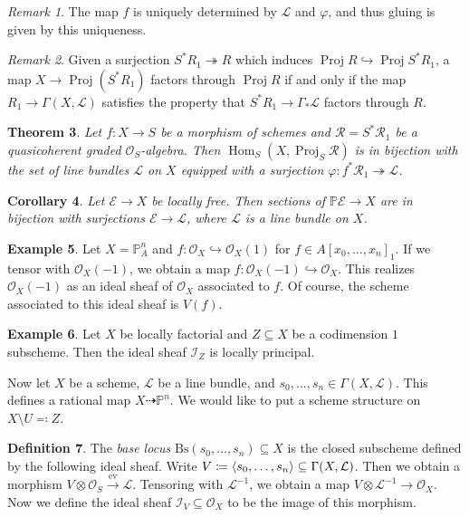 \documentclass[leqno, openany]{memoir}
\newtheorem{thm}{Theorem}[section]
\newtheorem{cor}[thm]{Corollary}
\theoremstyle{definition}
\newtheorem{defn}[thm]{Definition}
\newtheorem{exm}[thm]{Example}
\theoremstyle{remark}
\newtheorem{rmk}[thm]{Remark}
\theoremstyle{plain}
\theoremstyle{definition}
\theoremstyle{remark}
\renewcommand{\P}{\mathbb{P}}
\newcommand{\mc}[1]{\mathcal{#1}}
\newcommand{\mr}[1]{\mathrm{#1}}
\DeclareMathOperator{\Hom}{Hom}
\DeclareMathOperator{\Proj}{Proj}
\begin{document}
\begin{rmk} The map $f$ is uniquely determined by $\mc{L}$ and $\varphi$, and
thus gluing is given by this uniqueness.  \end{rmk}

\begin{rmk} Given a surjection $S^* R_1 \twoheadrightarrow R$ which induces
    $\Proj R \hookrightarrow \Proj S^* R_1$, a map $X \to \Proj(S^* R_1)$
    factors through $\Proj R$ if and only if the map $R_1 \to \Gamma(X,
    \mc{L})$ satisfies the property that $S^* R_1 \to \Gamma_* \mc{L}$ factors
    through $R$.  \end{rmk}

\begin{thm} Let $f \colon X \to S$ be a morphism of schemes and $\mc{R} = S^*
    \mc{R}_1$ be a quasicoherent graded $\mc{O}_S$-algebra. Then $\Hom_S(X,
    \Proj_S \mc{R})$ is in bijection with the set of line bundles $\mc{L}$ on
    $X$ equipped with a surjection $\varphi \colon f^* \mc{R}_1
    \twoheadrightarrow \mc{L}$.  \end{thm}

\begin{cor} Let $\mc{E} \to X$ be locally free. Then sections of $\P \mc{E} \to
X$ are in bijection with surjections $\mc{E} \to \mc{L}$, where $\mc{L}$ is a
line bundle on $X$.  \end{cor}

\begin{exm} Let $X = \P^n_A$ and $f \colon \mc{O}_X \hookrightarrow
    \mc{O}_X(1)$ for $f \in { A[x_0, \ldots, x_n] }_1$. If we tensor with
    $\mc{O}_X(-1)$, we obtain a map $f \colon \mc{O}_X(-1) \hookrightarrow
    \mc{O}_X$. This realizes $\mc{O}_X(-1)$ as an ideal sheaf of $\mc{O}_X$
    associated to $f$. Of course, the scheme associated to this ideal sheaf is
    $V(f)$.  \end{exm}

\begin{exm} Let $X$ be locally factorial and $Z \subseteq X$ be a codimension
$1$ subscheme. Then the ideal sheaf $\mc{I}_Z$ is locally principal.  \end{exm}

Now let $X$ be a scheme, $\mc{L}$ be a line bundle, and $s_0, \ldots, s_n \in
\Gamma(X, \mc{L})$. This defines a rational map $X \dashrightarrow \P^n$. We
would like to put a scheme structure on $X \setminus U \eqqcolon Z$.
\begin{defn} The \textit{base locus} $\mr{Bs}(s_0, \ldots, s_n) \subseteq X$ is
    the closed subscheme defined by the following ideal sheaf. Write $V
    \coloneqq \ev{s_0, \ldots, s_n} \subseteq \Gamma(X, \mc{L})$. Then we
    obtain a morphism $V \otimes \mc{O}_S \xrightarrow{\mr{ev}} \mc{L}$.
    Tensoring with $\mc{L}^{-1}$, we obtain a map $V \otimes \mc{L}^{-1} \to
    \mc{O}_X$. Now we define the ideal sheaf $\mc{I}_V \subseteq \mc{O}_X$ to
    be the image of this morphism.  \end{defn}
\end{document}
